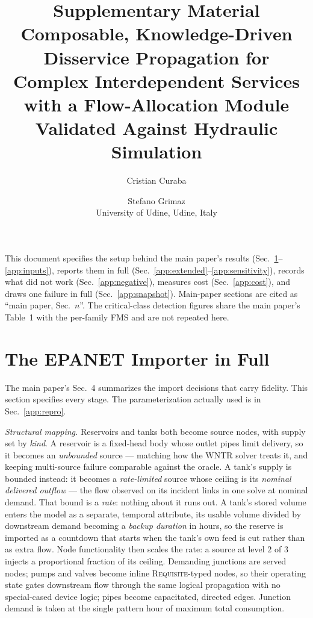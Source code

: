 \documentclass[11pt]{article}
\title{Supplementary Material\\[2mm]
\large Composable, Knowledge-Driven Disservice Propagation for Complex Interdependent
Services with a Flow-Allocation Module Validated Against Hydraulic Simulation}
\author{Cristian Curaba \and Stefano Grimaz\\
\normalsize University of Udine, Udine, Italy}
\date{}
\begin{document}
\maketitle

\noindent This document specifies the setup behind the main paper's results
(Sec.~\ref{app:importer}--\ref{app:inputs}), reports them in full
(Sec.~\ref{app:extended}--\ref{app:sensitivity}), records what did not work
(Sec.~\ref{app:negative}), measures cost (Sec.~\ref{app:cost}), and draws one failure in full (Sec.~\ref{app:snapshot}). Main-paper
sections are cited as ``main paper, Sec.~$n$''. The critical-class detection
figures share the main paper's Table~1 with the per-family FMS and are not
repeated here.

\section{The EPANET Importer in Full}\label{app:importer}

The main paper's Sec.~4 summarizes the import decisions that carry fidelity.
This section specifies every stage. The parameterization actually used is in
Sec.~\ref{app:repro}.

\emph{Structural mapping.} Reservoirs and tanks both become source nodes, with
supply set by \emph{kind}. A reservoir is a fixed-head body whose outlet pipes
limit delivery, so it becomes an \emph{unbounded} source --- matching how the
WNTR solver treats it, and keeping multi-source failure comparable against the
oracle. A tank's supply is bounded instead: it becomes a \emph{rate-limited} source
whose ceiling is its \emph{nominal delivered outflow} --- the flow observed on its
incident links in one solve at nominal demand. That bound is a \emph{rate}: nothing about it runs out.
A tank's stored volume enters the model as a separate, temporal attribute, its usable volume divided by downstream demand becoming
a \emph{backup duration} in hours, so the reserve is imported as a countdown
that starts when the tank's own feed is cut rather than as extra flow. Node
functionality then scales the rate: a source at level $2$ of $3$ injects a
proportional fraction of its ceiling. Demanding junctions are served
nodes; pumps and valves become inline \textsc{Requisite}-typed nodes, so their
operating state gates downstream flow through the same logical propagation with no
special-cased device logic; pipes become capacitated, directed edges. Junction
demand is taken at the single pattern hour of maximum total consumption.
\end{document}
